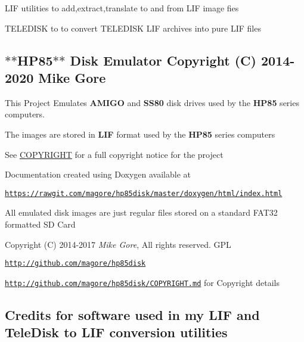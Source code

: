 
\begin{DoxyItemize}
\item L\+IF utilities to add,extract,translate to and from L\+IF image fies
\item T\+E\+L\+E\+D\+I\+SK to to convert T\+E\+L\+E\+D\+I\+SK L\+IF archives into pure L\+IF files 


\end{DoxyItemize}

\subsection*{$\ast$$\ast$\+H\+P85$\ast$$\ast$ Disk Emulator Copyright (C) 2014-\/2020 Mike Gore}


\begin{DoxyItemize}
\item This Project Emulates {\bfseries A\+M\+I\+GO} and {\bfseries S\+S80} disk drives used by the {\bfseries H\+P85} series computers.
\item The images are stored in {\bfseries L\+IF} format used by the {\bfseries H\+P85} series computers
\item See \hyperlink{COPYRIGHT_8md}{C\+O\+P\+Y\+R\+I\+G\+HT} for a full copyright notice for the project
\item Documentation created using Doxygen available at
\begin{DoxyItemize}
\item \href{https://rawgit.com/magore/hp85disk/master/doxygen/html/index.html}{\tt https\+://rawgit.\+com/magore/hp85disk/master/doxygen/html/index.\+html}
\item All emulated disk images are just regular files stored on a standard F\+A\+T32 formatted SD Card
\end{DoxyItemize}
\end{DoxyItemize}

Copyright (C) 2014-\/2017 {\itshape Mike Gore}, All rights reserved. G\+PL
\begin{DoxyItemize}
\item \href{http://github.com/magore/hp85disk}{\tt http\+://github.\+com/magore/hp85disk}
\item \href{http://github.com/magore/hp85disk/COPYRIGHT.md}{\tt http\+://github.\+com/magore/hp85disk/\+C\+O\+P\+Y\+R\+I\+G\+H\+T.\+md} for Copyright details
\end{DoxyItemize}





\subsection*{Credits for software used in my {\bfseries L\+IF} and {\bfseries Tele\+Disk to L\+IF} conversion utilities}

